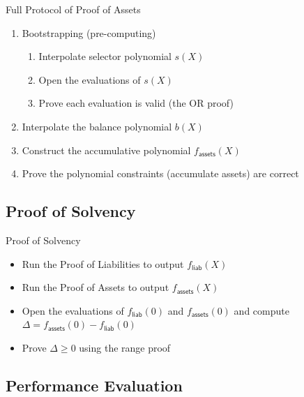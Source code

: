 \documentclass{beamer}
\begin{document}
  \begin{frame}{Full Protocol of Proof of Assets}
    \begin{enumerate}
        \item Bootstrapping (pre-computing)
        \begin{enumerate}
            \item Interpolate selector polynomial $s(X)$
            \item Open the evaluations of $s(X)$
            \item Prove each evaluation is valid (the OR proof)
        \end{enumerate}
        \item Interpolate the balance polynomial $b(X)$
        \item Construct the accumulative polynomial $f_\mathsf{assets}(X)$
        \item Prove the polynomial constraints (accumulate assets) are correct
    \end{enumerate}
  \end{frame}

  \subsection{Proof of Solvency}

  \begin{frame}{Proof of Solvency}
    \begin{itemize}
      \item Run the Proof of Liabilities to output $f_\mathsf{liab}(X)$
      \item Run the Proof of Assets to output $f_\mathsf{assets}(X)$
      \item Open the evaluations of $f_\mathsf{liab}(0)$ and $f_\mathsf{assets}(0)$ and compute $\Delta=f_\mathsf{assets}(0)-f_\mathsf{liab}(0)$
      \item Prove $\Delta\ge{0}$ using the range proof
    \end{itemize}
  \end{frame}

  \subsection{Performance Evaluation}
\end{document}
